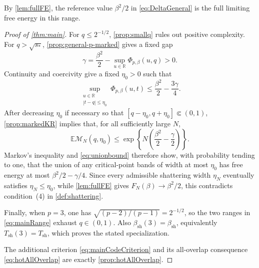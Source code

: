 \documentclass[11pt,reqno]{amsart}
\numberwithin{equation}{section}
\theoremstyle{plain}
\theoremstyle{definition}
\theoremstyle{remark}
\newcommand{\E}{\mathbb E}
\newcommand{\R}{\mathbb R}
\newcommand{\1}{\mathbf 1}
\newcommand{\bsh}{\beta_{\mathrm{sh}}}
\newcommand{\Tsh}{T_{\mathrm{sh}}}
\newcommand{\MN}{\mathcal M_N}
\begin{document}
By \cref{lem:fullFE}, the reference value \(\beta^2/2\) in
\eqref{eq:DeltaGeneral} is the full limiting free energy in this range.

\begin{proof}[Proof of \cref{thm:main}]
For \(q\leq2^{-1/2}\), \cref{prop:smallq} rules out positive
complexity.  For \(q>\sqrt{s_*}\), \cref{prop:general-p-marked} gives
a fixed gap
\[
 \gamma=\frac{\beta^2}{2}
 -\sup_{u\in\R}\Phi_{p,\beta}(u,q)>0.
\]
Continuity and coercivity give a fixed \(\eta_0>0\) such that
\[
 \sup_{\substack{u\in\R\\|t-q|\leq\eta_0}}
 \Phi_{p,\beta}(u,t)
 \leq\frac{\beta^2}{2}-\frac{3\gamma}{4}.
\]
After decreasing \(\eta_0\) if necessary so that
\([q-\eta_0,q+\eta_0]\Subset(0,1)\), \cref{prop:markedKR} implies that,
for all sufficiently large \(N\),
\[
 \E\MN(q,\eta_0)
 \leq\exp\left\{N\left(\frac{\beta^2}{2}-\frac\gamma2\right)\right\}.
\]
Markov's inequality and \eqref{eq:unionbound} therefore show, with
probability tending to one, that the union of any critical-point bands
of width at most \(\eta_0\) has free energy at most
\(\beta^2/2-\gamma/4\).  Since every admissible shattering width
\(\eta_N\) eventually satisfies \(\eta_N\leq\eta_0\), while
\cref{lem:fullFE} gives \(F_N(\beta)\to\beta^2/2\), this contradicts
condition~\textup{(4)} in \cref{def:shattering}.

Finally, when \(p=3\), one has
\(\sqrt{(p-2)/(p-1)}=2^{-1/2}\), so the two ranges in
\eqref{eq:mainRange} exhaust \(q\in(0,1)\).  Also
\(\beta_{\mathrm{sh}}(3)=\bsh\), equivalently
\(T_{\mathrm{sh}}(3)=\Tsh\), which proves the stated specialization.

The additional criterion \eqref{eq:mainCodeCriterion} and its
all-overlap consequence \eqref{eq:hotAllOverlap} are exactly
\cref{prop:hotAllOverlap}.
\end{proof}
\end{document}
